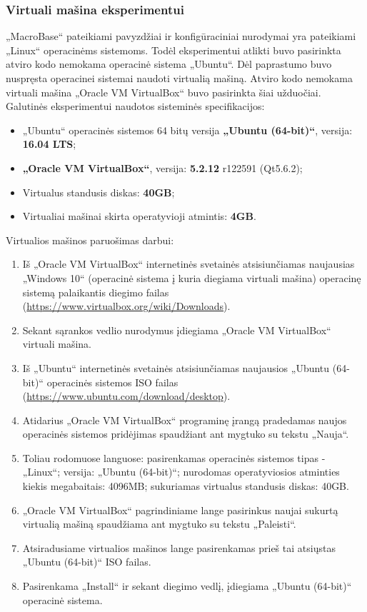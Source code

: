 \documentclass{VUMIFPSkursinis}
\begin{document}
\subsubsection{Virtuali mašina eksperimentui}
„MacroBase“ pateikiami pavyzdžiai ir konfigūraciniai nurodymai yra pateikiami „Linux“ operacinėms sistemoms. Todėl eksperimentui atlikti buvo pasirinkta atviro kodo nemokama operacinė sistema „Ubuntu“. Dėl paprastumo buvo nuspręsta operacinei sistemai naudoti virtualią mašiną. Atviro kodo nemokama virtuali mašina „Oracle VM VirtualBox“ buvo pasirinkta šiai užduočiai. Galutinės eksperimentui naudotos sisteminės specifikacijos:
\begin{itemize}
\item „Ubuntu“ operacinės sistemos 64 bitų versija \textbf{„Ubuntu (64-bit)“}, versija: \textbf{16.04 LTS};
\item \textbf{„Oracle VM VirtualBox“}, versija: \textbf{5.2.12} r122591 (Qt5.6.2);
\item Virtualus standusis diskas: \textbf{40GB};
\item Virtualiai mašinai skirta operatyvioji atmintis: \textbf{4GB}.

\end{itemize}

Virtualios mašinos paruošimas darbui:
\begin{enumerate}
\item  Iš „Oracle VM VirtualBox“ internetinės svetainės atsisiunčiamas naujausias „Windows 10“ (operacinė sistema į kuria diegiama virtuali mašina) operacinę sistemą palaikantis diegimo failas (\url{https://www.virtualbox.org/wiki/Downloads}).
\item Sekant sąrankos vedlio nurodymus įdiegiama „Oracle VM VirtualBox“ virtuali mašina.
\item Iš „Ubuntu“ internetinės svetainės atsisiunčiamas naujausios „Ubuntu (64-bit)“ operacinės sistemos ISO failas (\url{https://www.ubuntu.com/download/desktop}).
\item Atidarius „Oracle VM VirtualBox“ programinę įrangą pradedamas naujos operacinės sistemos pridėjimas spaudžiant ant mygtuko su tekstu „Nauja“.
\item Toliau rodomuose languose: pasirenkamas operacinės sistemos tipas - „Linux“; versija: „Ubuntu (64-bit)“; nurodomas operatyviosios atminties kiekis megabaitais: 4096MB; sukuriamas virtualus standusis diskas: 40GB.
\item „Oracle VM VirtualBox“ pagrindiniame lange pasirinkus naujai sukurtą virtualią mašiną spaudžiama ant mygtuko su tekstu „Paleisti“.
\item Atsiradusiame virtualios mašinos lange pasirenkamas prieš tai atsiųstas „Ubuntu (64-bit)“ ISO failas.
\item Pasirenkama „Install“ ir sekant diegimo vedlį, įdiegiama „Ubuntu (64-bit)“ operacinė sistema.
\end{enumerate}
\end{document}
